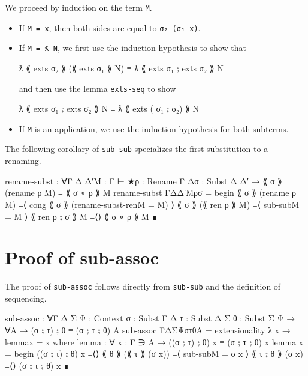 We proceed by induction on the term \texttt{M}.

\begin{itemize}
\item
  If \texttt{M\ =\ x}, then both sides are equal to
  \texttt{σ₂\ (σ₁\ x)}.
\item
  If \texttt{M\ =\ ƛ\ N}, we first use the induction hypothesis to show
  that

  \begin{myDisplay}
    ƛ ⟪ exts σ₂ ⟫ (⟪ exts σ₁ ⟫ N) ≡ ƛ ⟪ exts σ₁ ⨟ exts σ₂ ⟫ N
  \end{myDisplay}

  and then use the lemma \texttt{exts-seq} to show

  \begin{myDisplay}
    ƛ ⟪ exts σ₁ ⨟ exts σ₂ ⟫ N ≡ ƛ ⟪ exts ( σ₁ ⨟ σ₂) ⟫ N
  \end{myDisplay}
\item
  If \texttt{M} is an application, we use the induction hypothesis for
  both subterms.
\end{itemize}

The following corollary of \texttt{sub-sub} specializes the first
substitution to a renaming.

\begin{fence}
\begin{code}
rename-subst : ∀{Γ Δ Δ′}{M : Γ ⊢ ★}{ρ : Rename Γ Δ}{σ : Subst Δ Δ′}
             → ⟪ σ ⟫ (rename ρ M) ≡ ⟪ σ ∘ ρ ⟫ M
rename-subst {Γ}{Δ}{Δ′}{M}{ρ}{σ} =
   begin
     ⟪ σ ⟫ (rename ρ M)
   ≡⟨ cong ⟪ σ ⟫ (rename-subst-ren{M = M}) ⟩
     ⟪ σ ⟫ (⟪ ren ρ ⟫ M)
   ≡⟨ sub-sub{M = M} ⟩
     ⟪ ren ρ ⨟ σ ⟫ M
   ≡⟨⟩
     ⟪ σ ∘ ρ ⟫ M
   ∎
\end{code}
\end{fence}

\hypertarget{proof-of-sub-assoc}{%
\section{Proof of sub-assoc}\label{proof-of-sub-assoc}}

The proof of \texttt{sub-assoc} follows directly from \texttt{sub-sub}
and the definition of sequencing.

\begin{fence}
\begin{code}
sub-assoc : ∀{Γ Δ Σ Ψ : Context} {σ : Subst Γ Δ} {τ : Subst Δ Σ}
             {θ : Subst Σ Ψ}
          → ∀{A} → (σ ⨟ τ) ⨟ θ ≡ (σ ⨟ τ ⨟ θ) {A}
sub-assoc {Γ}{Δ}{Σ}{Ψ}{σ}{τ}{θ}{A} = extensionality λ x → lemma{x = x}
  where
  lemma : ∀ {x : Γ ∋ A} → ((σ ⨟ τ) ⨟ θ) x ≡ (σ ⨟ τ ⨟ θ) x
  lemma {x} =
      begin
        ((σ ⨟ τ) ⨟ θ) x
      ≡⟨⟩
        ⟪ θ ⟫ (⟪ τ ⟫ (σ x))
      ≡⟨ sub-sub{M = σ x} ⟩
        ⟪ τ ⨟ θ ⟫ (σ x)
      ≡⟨⟩
        (σ ⨟ τ ⨟ θ) x
      ∎
\end{code}
\end{fence}

